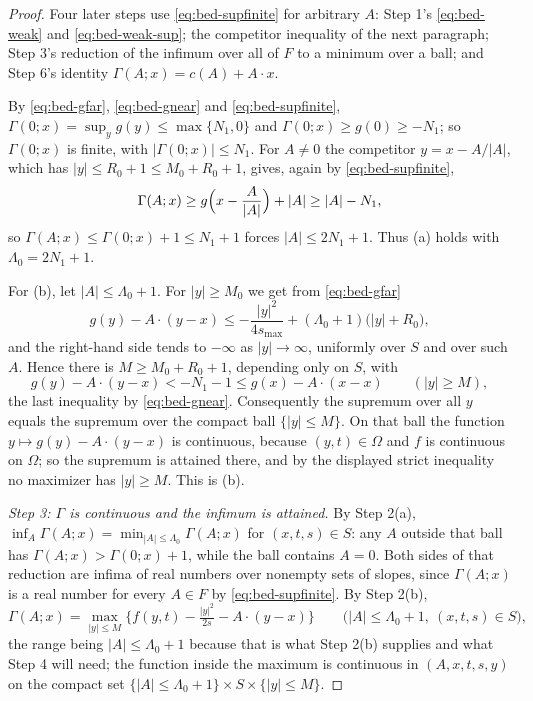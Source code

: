 \begin{proof}
Four later steps use \eqref{eq:bed-supfinite} for arbitrary $A$: Step 1's
\eqref{eq:bed-weak} and \eqref{eq:bed-weak-sup}; the competitor inequality of
the next paragraph; Step 3's reduction of the infimum over all of $F$ to a
minimum over a ball; and Step 6's identity $\Gamma(A;x)=c(A)+A\cdot x$.

By \eqref{eq:bed-gfar}, \eqref{eq:bed-gnear} and \eqref{eq:bed-supfinite},
$\Gamma(0;x)=\sup_yg(y)\le\max\{N_1,0\}$ and $\Gamma(0;x)\ge g(0)\ge-N_1$; so
$\Gamma(0;x)$ is finite, with $|\Gamma(0;x)|\le N_1$. For $A\ne0$ the competitor
$y=x-A/|A|$, which has $|y|\le R_0+1\le M_0+R_0+1$, gives, again by
\eqref{eq:bed-supfinite},
\[
  \Gamma(A;x)\ge g\Bigl(x-\frac A{|A|}\Bigr)+|A|\ge|A|-N_1 ,
\]
so $\Gamma(A;x)\le\Gamma(0;x)+1\le N_1+1$ forces $|A|\le2N_1+1$. Thus (a) holds
with $\Lambda_0=2N_1+1$.

For (b), let $|A|\le\Lambda_0+1$. For $|y|\ge M_0$ we get from
\eqref{eq:bed-gfar}
\[
  g(y)-A\cdot(y-x)\le-\frac{|y|^2}{4s_{\max}}+(\Lambda_0+1)\bigl(|y|+R_0\bigr),
\]
and the right-hand side tends to $-\infty$ as $|y|\to\infty$, uniformly over
$S$ and over such $A$. Hence there is $M\ge M_0+R_0+1$, depending only on $S$,
with
\[
  g(y)-A\cdot(y-x)<-N_1-1\le g(x)-A\cdot(x-x)
  \qquad(|y|\ge M),
\]
the last inequality by \eqref{eq:bed-gnear}. Consequently the supremum over all
$y$ equals the supremum over the compact ball $\{|y|\le M\}$. On that ball the
function $y\mapsto g(y)-A\cdot(y-x)$ is continuous, because $(y,t)\in\Omega$
and $f$ is continuous on $\Omega$; so the supremum is attained there, and by
the displayed strict inequality no maximizer has $|y|\ge M$. This is (b).

\emph{Step 3: $\Gamma$ is continuous and the infimum is attained.}
By Step 2(a), $\inf_A\Gamma(A;x)=\min_{|A|\le\Lambda_0}\Gamma(A;x)$ for
$(x,t,s)\in S$: any $A$ outside that ball has $\Gamma(A;x)>\Gamma(0;x)+1$, while
the ball contains $A=0$. Both sides of that reduction are infima of real numbers
over nonempty sets of slopes, since $\Gamma(A;x)$ is a real number for every
$A\in F$ by \eqref{eq:bed-supfinite}. By Step 2(b),
\begin{equation}\label{eq:bed-maxform}
  \Gamma(A;x)=\max_{|y|\le M}\bigl\{f(y,t)-\tfrac{|y|^2}{2s}-A\cdot(y-x)\bigr\}
  \qquad\bigl(|A|\le\Lambda_0+1,\ (x,t,s)\in S\bigr),
\end{equation}
the range being $|A|\le\Lambda_0+1$ because that is what Step 2(b) supplies and
what Step 4 will need; the function inside the maximum is continuous in
$(A,x,t,s,y)$ on the compact set
$\{|A|\le\Lambda_0+1\}\times S\times\{|y|\le M\}$.


\end{proof}
